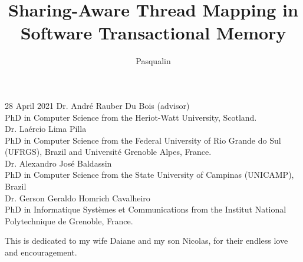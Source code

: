 \documentclass[tese,capa,english]{texufpel}
\title{Sharing-Aware Thread Mapping in Software Transactional Memory}
\author{Pasqualin}{Douglas Pereira}
\begin{document}
\maketitle 

\sloppy



\begin{aprovacao}{28 April 2021} %
\noindent Dr. André Rauber Du Bois (advisor)\\
PhD in Computer Science from the Heriot-Watt University, Scotland.\\[1cm]



\noindent Dr. Laércio Lima Pilla\\
PhD in Computer Science from the Federal University of Rio Grande do Sul (UFRGS), Brazil and Université Grenoble Alpes, France.\\[1cm]

\noindent Dr. Alexandro José Baldassin \\
PhD in Computer Science from the State University of Campinas (UNICAMP), Brazil \\[1cm]

\noindent Dr. Gerson Geraldo Homrich Cavalheiro\\
PhD in Informatique Systèmes et Communications from the Institut National Polytechnique de Grenoble, France.
\end{aprovacao}


\begin{dedicatoria}
	\begin{flushleft}	
			This is dedicated to my wife Daiane and my son Nicolas, for their endless love and encouragement.
	\end{flushleft}		
\end{dedicatoria}
\end{document}
